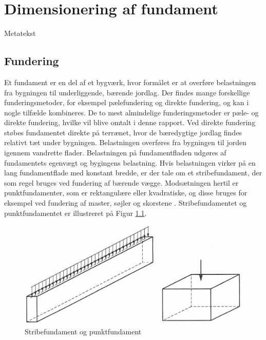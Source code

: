 \chapter{Dimensionering af fundament}

Metatekst
\section{Fundering}
Et fundament er en del af et bygværk, hvor formålet er at overføre belastningen fra bygningen til underliggende, bærende jordlag. Der findes mange forskellige funderingsmetoder, for eksempel pælefundering og direkte fundering, og kan i nogle tilfælde kombineres. De to mest almindelige funderingsmetoder er pæle- og direkte fundering, hvilke vil blive omtalt i denne rapport.
\newline \indent{     }  Ved direkte fundering støbes fundamentet direkte på terrænet, hvor de bæredygtige jordlag findes relativt tæt under bygningen. Belastningen overføres fra bygningen til jorden igennem vandrette flader. Belastningen på fundamentfladen udgøres af fundamentets egenvægt og bygingens belastning. Hvis belastningen virker på en lang fundamentflade med konstant bredde, er der tale om et stribefundament, der som regel bruges ved fundering af bærende vægge. Modsætningen hertil er punktfundamenter, som er rektangulære eller kvadratiske, og disse bruges for eksempel ved fundering af master, søjler og skorstene \citep[ s. 221]{geoteknik}. Stribefundamentet og punktfundamentet er illustreret på Figur \ref{fig:fundament}. 

\begin{figure}[htbp] \centering
	\begin{minipage}[b]{0.48\textwidth}\centering
		\includegraphics[width=1.0\textwidth]{billeder/fundament.png}
		\caption{Stribefundament og punktfundament \citep[ s. 221]{geoteknik}}
		\label{fig:fundament}
	\end{minipage}\hfill
\end{figure}

